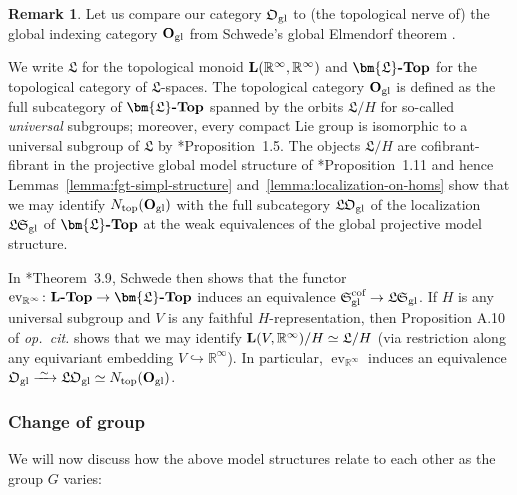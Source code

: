 \documentclass[reqno]{memo-l}
\theoremstyle{mythm}
\theoremstyle{definition}
\newtheorem{rk}[thm]{Remark}
\numberwithin{equation}{section}
\newcommand{\R} {{\mathbb{R}}}
\newcommand{\gl}{\textup{gl}}
\DeclareMathOperator{\ev}{ev}
\newcommand{\Ntop}{{N_\textup{top}}}
\newcommand{\cat}[1]{\textbf{\textup{#1}}}
\newcommand{\iso}{\xrightarrow{\;\smash{\raisebox{-0.25ex}{\ensuremath{\scriptstyle\sim}}}\;}}
\newcommand{\myS}{{{\mathfrak S\kern-.4pt}}}
\begin{document}
\begin{rk}\label{rk:mathfrak-O-gl-vs-Stefan}
    Let us compare our category $\mathfrak O_\gl$ to (the topological nerve of) the global indexing category $\cat{O}_\gl$ from Schwede's global Elmendorf theorem \cite{schwede_orbispaces_2020}. 
    
    We write $\mathfrak L$ for the topological monoid $\cat{L}(\R^\infty,\R^\infty)$ and $\cat{$\bm{\mathfrak L}$-Top}$ for the topological category of $\mathfrak L$-spaces. The topological category $\cat{O}_\gl$ is defined as the full subcategory of $\cat{$\bm{\mathfrak L}$-Top}$ spanned by the orbits $\mathfrak L/H$ for so-called \emph{universal} subgroups; moreover, every compact Lie group is isomorphic to a universal subgroup of $\mathfrak L$ by \cite{schwede_orbispaces_2020}*{Proposition~1.5}. The objects $\mathfrak L/H$ are cofibrant-fibrant in the projective global model structure of \cite{schwede_orbispaces_2020}*{Proposition~1.11} and hence Lemmas~\ref{lemma:fgt-simpl-structure} and~\ref{lemma:localization-on-homs} show that we may identify $\Ntop(\cat{O}_\gl)$ with the full subcategory $\mathfrak L\kern-.4pt\mathfrak O_\gl$ of the localization $\mathfrak L\kern-.4pt\mathfrak S_\gl$ of $\cat{$\bm{\mathfrak L}$-Top}$ at the weak equivalences  of the global projective model structure.
    
    In \cite{schwede_orbispaces_2020}*{Theorem~3.9}, Schwede then shows that the functor $\ev_{\R^\infty}\colon\cat{$\cat{L}$-Top}\to\cat{$\bm{\mathfrak L}$-Top}$ induces an equivalence $\myS_\gl^\text{cof}\to\mathfrak L\kern-.4pt\mathfrak S_\gl$. If $H$ is any universal subgroup and $V$ is any faithful $H$-representation, then Proposition A.10 of \emph{op.\ cit.} shows that we may identify $\cat{L}(V,\R^\infty)/H\simeq\mathfrak L/H$ (via restriction along any equivariant embedding $V\hookrightarrow\R^\infty$). In particular, $\ev_{\R^\infty}$ induces an equivalence $\mathfrak O_\gl\iso\mathfrak L\kern-.4pt\mathfrak O_\gl\simeq\Ntop(\cat{O}_\gl)$.
\end{rk}

\subsubsection{Change of group}
We will now discuss how the above model structures relate to each other as the group $G$ varies:
\end{document}
